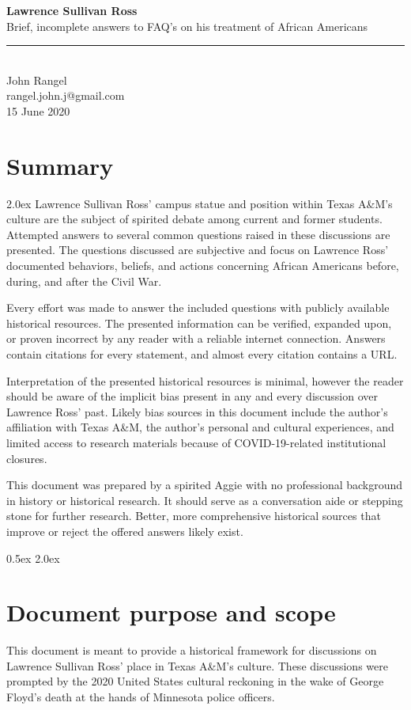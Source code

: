 \documentclass[12pt]{article}
\begin{document}
\Large{\textbf{Lawrence Sullivan Ross \\}}
\large{Brief, incomplete answers to FAQ's on his treatment of African Americans \\}
\rule{\textwidth}{1pt}
\\John Rangel\\rangel.john.j@gmail.com\\15 June 2020
\section{Summary}
\parskip 2.0ex
Lawrence Sullivan Ross' campus statue and position within Texas A\&M's culture are the subject of spirited debate among current and former students. Attempted answers to several common questions raised in these discussions are presented. The questions discussed are subjective and focus on Lawrence Ross' documented behaviors, beliefs, and actions concerning African Americans before, during, and after the Civil War. 

Every effort was made to answer the included questions with publicly available historical resources. The presented information can be verified, expanded upon, or proven incorrect by any reader with a reliable internet connection. Answers contain citations for every statement, and almost every citation contains a URL. 

Interpretation of the presented historical resources is minimal, however the reader should be aware of the implicit bias present in any and every discussion over Lawrence Ross' past. Likely bias sources in this document include the author's affiliation with Texas A\&M, the author's personal and cultural experiences, and limited access to research materials because of COVID-19-related institutional closures.

This document was prepared by a spirited Aggie with no professional background in history or  historical research. It should serve as a conversation aide or stepping stone for further research. Better, more comprehensive historical sources that improve or reject the offered answers likely exist. 

\parskip 0.5ex
\newpage
\tableofcontents
\parskip 2.0ex

\newpage
\section{Document purpose and scope}
This document is meant to provide a historical framework for discussions on Lawrence Sullivan Ross' place in Texas A\&M's culture. These discussions were prompted by the 2020 United States cultural reckoning in the wake of George Floyd's death at the hands of Minnesota police officers. 
\end{document}

